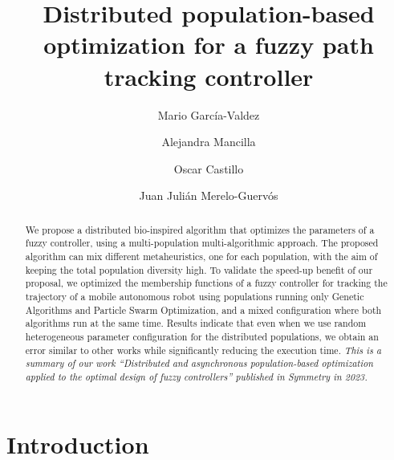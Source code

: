 \documentclass[runningheads]{llncs}
\begin{document}
%
\title{Distributed population-based optimization for a fuzzy path tracking controller}
%
%
\author{Mario García-Valdez \and
Alejandra Mancilla \and
Oscar Castillo \and 
Juan Julián Merelo-Guervós}
%
%
%
\maketitle              %
%
\begin{abstract}
  We propose a distributed bio-inspired algorithm that optimizes the parameters
  of a fuzzy controller, using a multi-population multi-algorithmic approach.
  The proposed algorithm can mix different metaheuristics, one for each
  population, with the aim of keeping the total population diversity high. To
  validate the speed-up benefit of our proposal, we optimized the membership
  functions of a fuzzy controller for tracking the trajectory of a mobile
  autonomous robot using populations running only Genetic Algorithms and
  Particle Swarm Optimization, and a mixed configuration where both algorithms
  run at the same time. Results indicate that even when we use random
  heterogeneous parameter configuration for the distributed populations, we
  obtain an error similar to other works while significantly reducing the
  execution time.  \textit{ This is a summary of our work ``Distributed and
    asynchronous population-based optimization applied to the optimal design of
    fuzzy controllers'' published in Symmetry in 2023. \cite{garcia2023}}
\end{abstract}
%
%
%
\section{Introduction}
\end{document}
